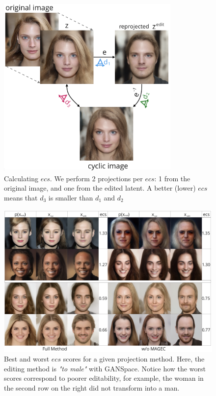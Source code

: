  \begin{figure}
  \centering
  \includegraphics[width=0.8\textwidth]{images/magec/edit_consistency5.png}
  \caption{Calculating $ecs$. We perform 2 projections per $ecs$: 1 from the original image, and one from the edited latent. A better (lower) $ecs$ means that $d_3$ is smaller than $d_1$ and $d_2$}
  \label{fig:ecs_intuition}
 \end{figure}


\begin{figure}
  \centering
  \includegraphics[width=\textwidth]{images/magec/edit_consistencies2.png}
  \caption{Best and worst $ecs$ scores for a given projection method. Here, the editing method is \emph{"to male"} with GANSpace. Notice how the worst scores correspond to poorer editability, for example, the woman in the second row on the right did not transform into a man.}
  \label{fig:ecs_examples}
\end{figure}






